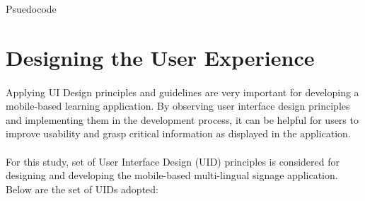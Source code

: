 \documentclass[12pt]{article}
\makeatletter
\def\BState{\State\hskip-\ALG@thistlm}
\makeatother
\begin{document}
\begin{algorithm}
\caption{Psuedocode}\label{euclid}
\end{algorithm}

\section{Designing the User Experience}
\label{ux}
\paragraph{} Applying UI Design principles and guidelines are very important for developing a mobile-based learning application. By observing user interface design principles and implementing them in the development process, it can be helpful for users to improve usability and grasp critical information as displayed in the application. 

\paragraph{} For this study, set of User Interface Design (UID) principles is considered \cite{uid} for designing and developing the mobile-based multi-lingual signage application. Below are the set of UIDs adopted:
\end{document}
